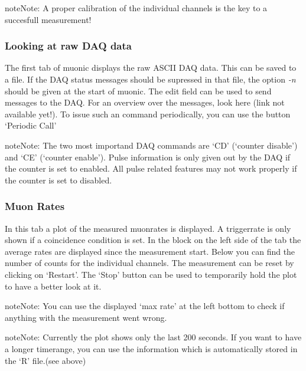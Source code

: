 \documentclass[letterpaper,10pt,english]{sphinxmanual}
\begin{document}
\begin{notice}{note}{Note:}
A proper calibration of the individual channels is the key to a succesfull measurement!
\end{notice}


\subsubsection{Looking at raw DAQ data}
\label{tutorial:looking-at-raw-daq-data}
The first tab of muonic displays the raw ASCII DAQ data.
This can be saved to a file. If the DAQ status messages should be supressed in that file, the option \emph{-n} should be given at the start of muonic.
The edit field can be used to send messages to the DAQ. For an overview over the messages, look here (link not available yet!).
To issue such an command periodically, you can use the button `Periodic Call'

\begin{notice}{note}{Note:}
The two most importand DAQ commands are `CD' (`counter disable') and `CE' (`counter enable'). Pulse information is only given out by the DAQ if the counter is set to enabled. All pulse related features may not work properly if the counter is set to disabled.
\end{notice}


\subsubsection{Muon Rates}
\label{tutorial:muon-rates}
In this tab a plot of the measured muonrates is displayed. A triggerrate is only shown if a coincidence condition is set.
In the block on the left side of the tab the average rates are displayed since the measurement start. Below you can find the number of counts for the individual channels. The measurement can be reset by clicking on `Restart'. The `Stop' button can be used to temporarily hold the plot to have a better look at it.

\begin{notice}{note}{Note:}
You can use the displayed `max rate' at the left bottom to check if anything with the measurement went wrong.
\end{notice}

\begin{notice}{note}{Note:}
Currently the plot shows only the last 200 seconds. If you want to have a longer timerange, you can use the information which is automatically stored in the `R' file.(see above)
\end{notice}
\end{document}
